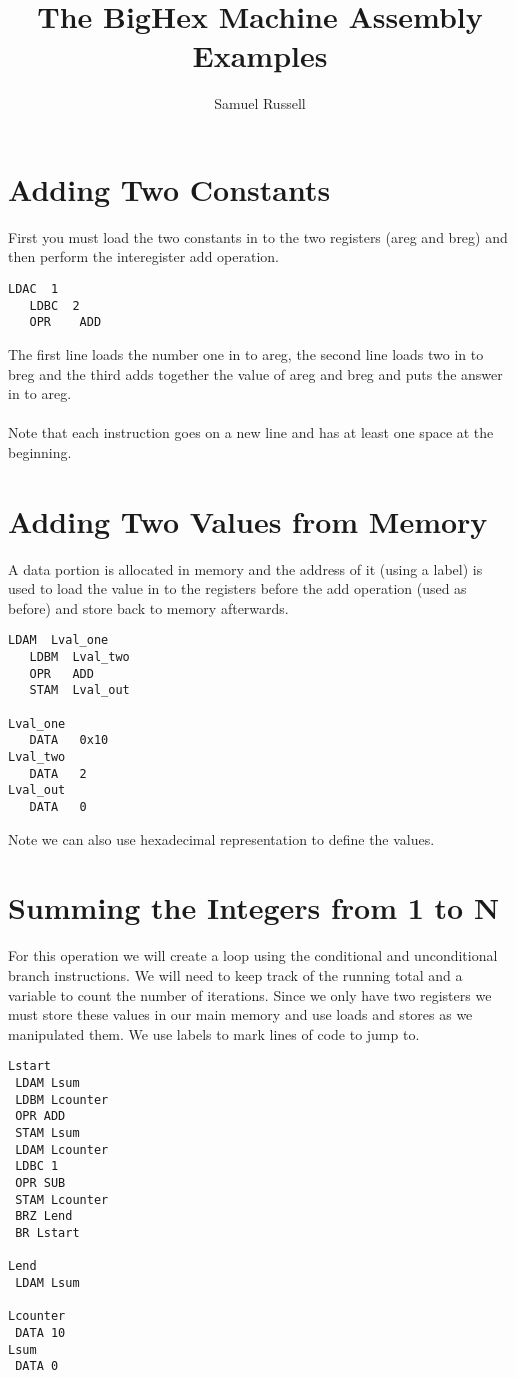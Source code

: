\documentclass[10pt,a4paper]{article}
\author{Samuel Russell}
\title{The BigHex Machine Assembly Examples}
\begin{document}
\maketitle


\section{Adding Two Constants}

First you must load the two constants in to the two registers (areg and breg) and then perform the interegister add operation. 
\\
\begin{lstlisting}[frame=single]
   LDAC  1
   LDBC  2
   OPR    ADD
\end{lstlisting}

The first line loads the number one in to areg, the second line loads two in to breg and the third adds together the value of areg and breg and puts the answer in to areg.
\\\\
Note that each instruction goes on a new line and has at least one space at the beginning.

\section{Adding Two Values from Memory}

A data portion is allocated in memory and the address of it (using a label) is used to load the value in to the registers before the add operation (used as before) and store back to memory afterwards.
\\
\begin{lstlisting}[frame=single]
   LDAM  Lval_one
   LDBM  Lval_two
   OPR   ADD
   STAM  Lval_out

Lval_one
   DATA   0x10
Lval_two
   DATA   2
Lval_out
   DATA   0
\end{lstlisting}

Note we can also use hexadecimal representation to define the values.
\newpage
\section{Summing the Integers from 1 to N}

For this operation we will create a loop using the conditional and unconditional branch instructions. We will need to keep track of the running total and a variable to count the number of iterations. Since we only have two registers we must store these values in our main memory and use loads and stores as we manipulated them.
We use labels to mark lines of code to jump to.
\\
\begin{lstlisting}[frame=single]
Lstart
 LDAM Lsum
 LDBM Lcounter
 OPR ADD
 STAM Lsum
 LDAM Lcounter
 LDBC 1
 OPR SUB
 STAM Lcounter
 BRZ Lend
 BR Lstart

Lend
 LDAM Lsum

Lcounter
 DATA 10
Lsum
 DATA 0
\end{lstlisting}
\end{document}
